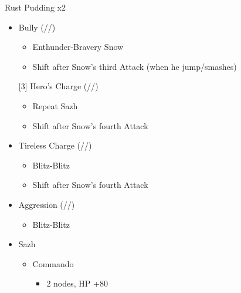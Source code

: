 \renewcommand{\first}{[1] }
\renewcommand{\second}{[2] Devastation (\com/\sab/\com)}
\renewcommand{\third}{[3] Hero's Charge (\syn/\med/\com)}
\renewcommand{\fourth}{[4] Tireless Charge (\com/\med/\com)}
\renewcommand{\fifth}{[5] Bully (\syn/\sab/\com)}
\renewcommand{\sixth}{[6] Aggression (\com/\rav/\com)}
\newpage
\begin{multicols}{2}
  \begin{battle}[0:24]{Rust Pudding x2}
    \begin{itemize}
      \item \fifth
            \begin{itemize}
              \item Enthunder-Bravery Snow
              \item Shift after Snow's third Attack (when he jump/smashes)
            \end{itemize}
            \third
            \begin{itemize}
              \item Repeat Sazh
              \item Shift after Snow's fourth Attack
            \end{itemize}
      \item \fourth
            \begin{itemize}
              \item Blitz-Blitz
              \item Shift after Snow's fourth Attack
            \end{itemize}
      \item \sixth
            \begin{itemize}
              \item Blitz-Blitz
            \end{itemize}
    \end{itemize}
  \end{battle}
  \begin{menu}
    \begin{itemize}
      \crystarium
      \begin{itemize}
        \item Sazh
              \begin{itemize}
                \item Commando
                      \begin{itemize}
                        \item 2 nodes, HP +80
                      \end{itemize}

\end{itemize}
\end{itemize}
\end{itemize}
\end{menu}
\end{multicols}
